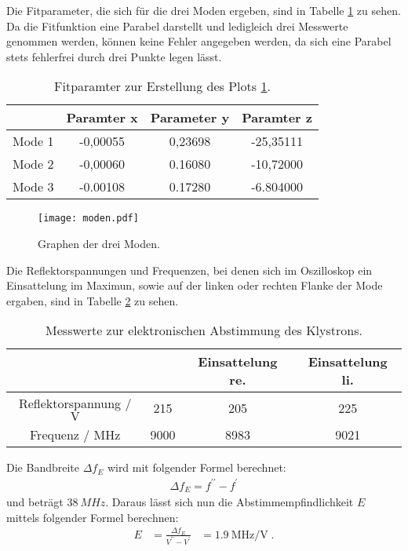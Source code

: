 \noindent Die Fitparameter, die sich für die drei Moden ergeben, sind in Tabelle
\ref{tab:Modenfit} zu sehen. Da die Fitfunktion eine Parabel darstellt und ledigleich
drei Messwerte genommen werden, können keine Fehler angegeben werden, da sich eine
Parabel stets fehlerfrei durch drei Punkte legen lässt.
\FloatBarrier
\begin{table}
    \centering
    \begin{tabular}{c c c c}
        \toprule
            {}    &  {Paramter x}  &  {Parameter y } &  {Paramter  z }\\
        \midrule
        Mode 1 &  -0,00055  &  0,23698  &  -25,35111          \\
        Mode 2 &  -0,00060  &  0.16080  &  -10,72000          \\
        Mode 3 &  -0.00108  &  0.17280  &  -6.804000          \\
        \bottomrule
    \end{tabular}
    \caption{Fitparamter zur Erstellung des Plots \ref{fig:Moden}.}
    \label{tab:Modenfit}
\end{table}
\FloatBarrier
\begin{figure}
  \centering
  \texttt{[image: moden.pdf]}
  \caption{Graphen der drei Moden.}
  \label{fig:Moden}
\end{figure}
Die Reflektorspannungen und Frequenzen, bei denen sich im Oszilloskop ein Einsattelung
im Maximun, sowie auf der linken oder rechten Flanke der Mode ergaben, sind in Tabelle
\ref{tab:elektronische_Abstimmung} zu sehen.
\FloatBarrier
\begin{table}
    \centering
    \begin{tabular}{c c c c}
        \toprule
        {}    & {Einsattelung auf dem Maximun & Einsattelung re. } & {Einsattelung li.} \\
        \midrule
        Reflektorspannung / $\si{\V}$ & 215 & 205 & 225                           \\
        Frequenz / $\si{\MHz}$ & 9000 & 8983 & 9021                               \\
        \bottomrule
    \end{tabular}
    \caption{Messwerte zur elektronischen Abstimmung des Klystrons.}
    \label{tab:elektronische_Abstimmung}
\end{table}
\FloatBarrier
Die Bandbreite $\Delta f_{E}$ wird mit folgender Formel berechnet:
\begin{align*}
    \Delta f_E = f^{\prime\prime} - f^{\prime}
\end{align*}
\FloatBarrier
und beträgt $\SI{38}{MHz}$.
Daraus lässt sich nun die Abstimmempfindlichkeit $E$ mittels folgender Formel berechnen:
\begin{align*}
    E &= \frac{\Delta f_{E}}{V^{\prime \prime}-V^{\prime}}
      &= \SI{1,9}{\MHz \per \V} \;.
\end{align*}

